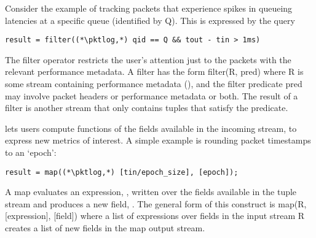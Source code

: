 
 Consider the
example of tracking packets that experience spikes in queueing latencies at a
specific queue (identified by {\ct Q}). This is expressed by the query
\begin{lstlisting}
result = filter((*\pktlog,*) qid == Q && tout - tin > 1ms)
\end{lstlisting}
The {\ct filter} operator restricts the user's attention just to the packets
with the relevant performance metadata. A filter has the form {\ct filter(R,
pred)} where {\ct R} is some stream containing performance metadata (\eg {\ct
\pktlog}), and the filter predicate {\ct pred} may involve packet headers or
performance metadata or both. The result of a filter is another stream that
only contains tuples that satisfy the predicate.

 \TheSystem lets users compute
functions of the fields available in the incoming stream, to express new metrics
of interest. A simple example is rounding packet timestamps to an `epoch':
\begin{lstlisting}
result = map((*\pktlog,*) [tin/epoch_size], [epoch]);
\end{lstlisting}
A {\ct map} evaluates an expression, , written over the
fields available in the tuple stream and produces a new field, . The general form of this construct is {\ct map(R, [expression],
  [field])} where a list of {\ct expression}s over fields in the input stream
{\ct R} creates a list of new {\ct field}s in the {\ct map} output stream.

